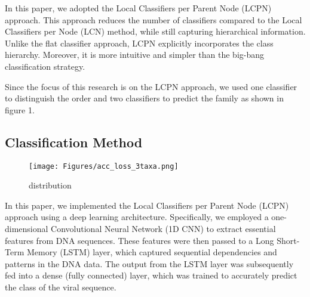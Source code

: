 In this paper, we adopted the Local Classifiers per Parent Node (LCPN) approach. This approach reduces the number of classifiers compared to the Local Classifiers per Node (LCN) method, while still capturing hierarchical information. Unlike the flat classifier approach, LCPN explicitly incorporates the class hierarchy. Moreover, it is more intuitive and simpler than the big-bang classification strategy.

Since the focus of this research is on the LCPN approach, we used one classifier to distinguish the order and two classifiers to predict the family as shown in figure 1.


\subsection{Classification Method}

\begin{figure*}[t]
\begin{centering}
		\texttt{[image: Figures/acc\_loss\_3taxa.png]}
	\caption{distribution  }
\label{fig:cnn-archit}
\end{centering}
\end{figure*}

In this paper, we implemented the Local Classifiers per Parent Node (LCPN) approach using a deep learning architecture. Specifically, we employed a one-dimensional Convolutional Neural Network (1D CNN) to extract essential features from DNA sequences. These features were then passed to a Long Short-Term Memory (LSTM) layer, which captured sequential dependencies and patterns in the DNA data. The output from the LSTM layer was subsequently fed into a dense (fully connected) layer, which was trained to accurately predict the class of the viral sequence.


